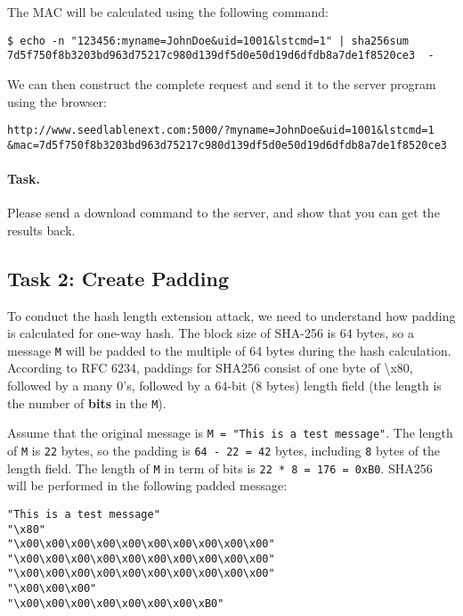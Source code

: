 The MAC will be calculated using the following command:

\begin{lstlisting}
$ echo -n "123456:myname=JohnDoe&uid=1001&lstcmd=1" | sha256sum
7d5f750f8b3203bd963d75217c980d139df5d0e50d19d6dfdb8a7de1f8520ce3  -
\end{lstlisting}

We can then construct the complete request and send it to the server program using
the browser:

\begin{lstlisting}
http://www.seedlablenext.com:5000/?myname=JohnDoe&uid=1001&lstcmd=1
&mac=7d5f750f8b3203bd963d75217c980d139df5d0e50d19d6dfdb8a7de1f8520ce3 
\end{lstlisting}

\paragraph{Task.} Please send a download command to the server, and 
show that you can get the results back. 


\subsection{Task 2: Create Padding}

To conduct the hash length extension attack, we 
need to understand how padding is calculated for
one-way hash. The block size of SHA-256 is 64 bytes, so 
a message \texttt{M} will be padded to the multiple of 
64 bytes during the hash calculation. 
According to RFC 6234, paddings for SHA256 consist of one byte
of \textbackslash x80, followed by a many 0's, followed by a 
64-bit (8 bytes) length field (the length is the number 
of \textbf{bits} in the \texttt{M}). 

Assume that the original message is \texttt{M = "This is a test message"}. 
The length of \texttt{M} is \texttt{22} bytes, so the 
padding is \texttt{64 - 22 = 42} bytes, including \texttt{8} bytes of the length field.   
The length of \texttt{M} in term of bits
is \texttt{22 * 8 = 176 = 0xB0}.
SHA256 will be performed in the following padded 
message: 

\begin{lstlisting}
"This is a test message"
"\x80"
"\x00\x00\x00\x00\x00\x00\x00\x00\x00\x00"
"\x00\x00\x00\x00\x00\x00\x00\x00\x00\x00"
"\x00\x00\x00\x00\x00\x00\x00\x00\x00\x00"
"\x00\x00\x00"
"\x00\x00\x00\x00\x00\x00\x00\xB0"
\end{lstlisting}


